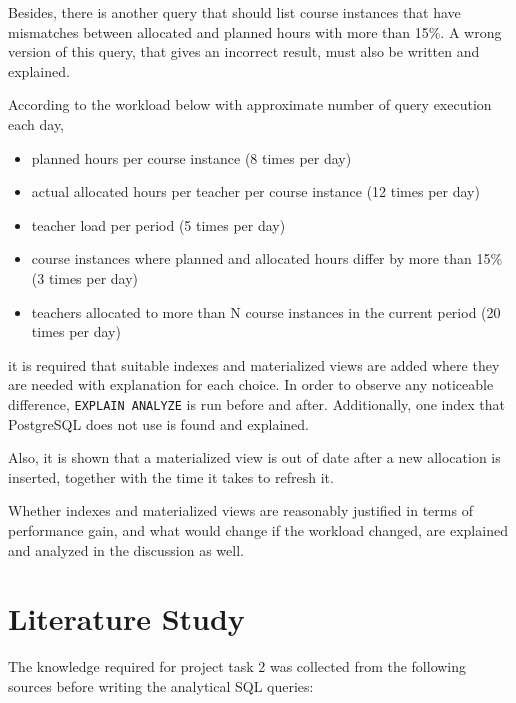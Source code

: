 \documentclass[a4paper]{scrartcl}
\renewcommand{\_}{\textunderscore\allowbreak}
\begin{document}
Besides, there is another query that should list course instances that have mismatches between allocated and planned hours with more than 15\%. A wrong version of this query, that gives an incorrect result, must also be written and explained.

According to the workload below with approximate number of query execution each day,
\begin{itemize}
  \item planned hours per course instance (8 times per day)
  \item actual allocated hours per teacher per course instance (12 times per day)
  \item teacher load per period (5 times per day)
  \item course instances where planned and allocated hours differ by more than 15\% (3 times per day)
  \item teachers allocated to more than N course instances in the current period (20 times per day)
\end{itemize}

it is required that suitable indexes and materialized views are added where they are needed with explanation for each choice. In order to observe any noticeable difference, \texttt{EXPLAIN ANALYZE} is run before and after. Additionally, one index that PostgreSQL does not use is found and explained.

Also, it is shown that a materialized view is out of date after a new allocation is inserted, together with the time it takes to refresh it.

Whether indexes and materialized views are reasonably justified in terms of performance gain, and what would change if the workload changed, are explained and analyzed in the discussion as well. 

\section{Literature Study}


The knowledge required for project task 2 was collected from the following sources before writing the analytical SQL queries:
\end{document}

